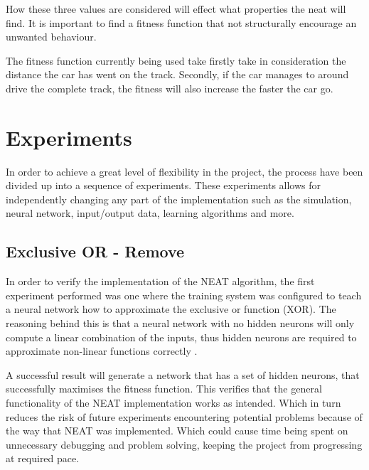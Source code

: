 How these three values are considered will effect what properties the neat will find. It is important to find a fitness function that not structurally encourage an unwanted behaviour.

The fitness function currently being used take firstly take in consideration the distance the car has went on the track. Secondly, if the car manages to around drive the complete track, the fitness will also increase the faster the car go.


\section{Experiments}
In order to achieve a great level of flexibility in the project, the process have been divided up into a sequence of experiments. These experiments allows for independently changing any part of the implementation such as the simulation, neural network, input/output data, learning algorithms and more.



\subsection{Exclusive OR - Remove}
In order to verify the implementation of the NEAT algorithm, the first experiment performed was one where the training system was configured to teach a neural network how to approximate the exclusive or function (XOR). The reasoning behind this is that a neural network with no hidden neurons will only compute a linear combination of the inputs, thus hidden neurons are required to approximate non-linear functions correctly \cite{haykin:xor, stanley:neat}.

A successful result will generate a network that has a set of hidden neurons, that successfully maximises the fitness function. This verifies that the general functionality of the NEAT implementation works as intended. Which in turn reduces the risk of future experiments encountering potential problems because of the way that NEAT was implemented. Which could cause time being spent on unnecessary debugging and problem solving, keeping the project from progressing at required pace.


